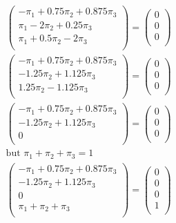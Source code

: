 \documentclass[11px]{article}
\begin{document}
\begin{equation}
\begin{split}
& \begin{pmatrix}
-\pi_1 + 0.75 \pi_2 + 0.875 \pi_3 \\
\pi_1 - 2 \pi_2 + 0.25 \pi_3 \\
\pi_1 + 0.5 \pi_2 - 2 \pi_3 \\
\end{pmatrix}
=
\begin{pmatrix}
0 \\
0 \\
0 \\
\end{pmatrix} \\
& \begin{pmatrix}
-\pi_1 + 0.75 \pi_2 + 0.875 \pi_3 \\
- 1.25 \pi_2 + 1.125 \pi_3 \\
1.25 \pi_2 - 1.125 \pi_3 \\
\end{pmatrix}
=
\begin{pmatrix}
0 \\
0 \\
0 \\
\end{pmatrix} \\
& \begin{pmatrix}
-\pi_1 + 0.75 \pi_2 + 0.875 \pi_3 \\
- 1.25 \pi_2 + 1.125 \pi_3 \\
0 \\
\end{pmatrix}
=
\begin{pmatrix}
0 \\
0 \\
0 \\
\end{pmatrix} \\
& \text{but } \pi_1 + \pi_2 + \pi_3 = 1 \\
& \begin{pmatrix}
-\pi_1 + 0.75 \pi_2 + 0.875 \pi_3 \\
- 1.25 \pi_2 + 1.125 \pi_3 \\
0 \\
\pi_1 + \pi_2 + \pi_3 \\
\end{pmatrix}
=
\begin{pmatrix}
0 \\
0 \\
0 \\
1 \\
\end{pmatrix} \\

\end{split}
\end{equation}
\end{document}
